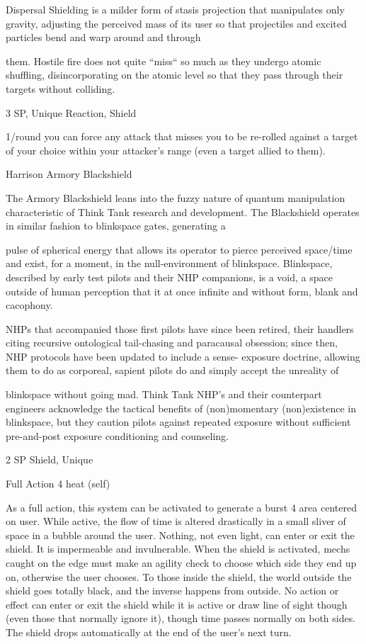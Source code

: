 Dispersal Shielding is a milder form of stasis projection that manipulates only gravity, adjusting the
perceived mass of its user so that projectiles and excited particles bend and warp around and through




them. Hostile fire does not quite ``miss`` so much as they undergo atomic shuffling, disincorporating on the
atomic level so that they pass through their targets without colliding.

3 SP, Unique
Reaction, Shield

1/round you can force any attack that misses you to be re-rolled against a target of your choice
within your attacker’s range (even a target allied to them).


Harrison Armory Blackshield

The Armory Blackshield leans into the fuzzy nature of quantum manipulation characteristic of Think Tank
research and development. The Blackshield operates in similar fashion to blinkspace gates, generating a

pulse of spherical energy that allows its operator to pierce perceived space/time and exist, for a moment, in
the null-environment of blinkspace. Blinkspace, described by early test pilots and their NHP companions, is
a void, a space outside of human perception that it at once infinite and without form, blank and cacophony.

NHPs that accompanied those first pilots have since been retired, their handlers citing recursive ontological
tail-chasing and paracausal obsession; since then, NHP protocols have been updated to include a sense-
exposure doctrine, allowing them to do as corporeal, sapient pilots do and simply accept the unreality of

blinkspace without going mad. Think Tank NHP's and their counterpart engineers acknowledge the tactical
benefits of (non)momentary (non)existence in blinkspace, but they caution pilots against repeated exposure
without sufficient pre-and-post exposure conditioning and counseling.

2 SP
Shield, Unique

Full Action
4 heat (self)

As a full action, this system can be activated to generate a burst 4 area centered on user. While
active, the flow of time is altered drastically in a small sliver of space in a bubble around the user.
Nothing, not even light, can enter or exit the shield. It is impermeable and invulnerable. When the
shield is activated, mechs caught on the edge must make an agility check to choose which side
they end up on, otherwise the user chooses. To those inside the shield, the world outside the
shield goes totally black, and the inverse happens from outside. No action or effect can enter or
exit the shield while it is active or draw line of sight though (even those that normally ignore it),
though time passes normally on both sides. The shield drops automatically at the end of the
user’s next turn.


